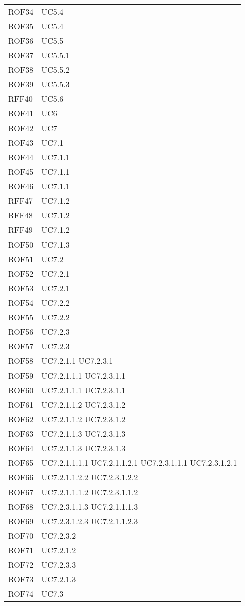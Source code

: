\documentclass[../AnalisiDeiRequisiti_v3.0.0.tex]{subfiles}
\begin{document}
\begin{longtable}{p{4cm}!{\VRule[1pt]}p{4cm}}
ROF34 & UC5.4 \\
ROF35 & UC5.4 \\
ROF36 & UC5.5 \\
ROF37 & UC5.5.1 \\
ROF38 & UC5.5.2 \\
ROF39 & UC5.5.3 \\
RFF40 & UC5.6 \\
ROF41 & UC6 \\
ROF42 & UC7 \\
ROF43 & UC7.1 \\
ROF44 & UC7.1.1 \\
ROF45 & UC7.1.1 \\
ROF46 & UC7.1.1 \\
RFF47 & UC7.1.2 \\
RFF48 & UC7.1.2 \\
RFF49 & UC7.1.2 \\
ROF50 & UC7.1.3 \\
ROF51 & UC7.2 \\
ROF52 & UC7.2.1 \\
ROF53 & UC7.2.1 \\
ROF54 & UC7.2.2 \\
ROF55 & UC7.2.2 \\
ROF56 & UC7.2.3 \\
ROF57 & UC7.2.3 \\
ROF58 & UC7.2.1.1 UC7.2.3.1 \\
ROF59 & UC7.2.1.1.1 UC7.2.3.1.1 \\
ROF60 & UC7.2.1.1.1 UC7.2.3.1.1 \\
ROF61 & UC7.2.1.1.2 UC7.2.3.1.2 \\
ROF62 & UC7.2.1.1.2 UC7.2.3.1.2 \\
ROF63 & UC7.2.1.1.3 UC7.2.3.1.3 \\
ROF64 & UC7.2.1.1.3 UC7.2.3.1.3 \\
ROF65 & UC7.2.1.1.1.1 UC7.2.1.1.2.1 UC7.2.3.1.1.1 UC7.2.3.1.2.1 \\
ROF66 & UC7.2.1.1.2.2 UC7.2.3.1.2.2 \\
ROF67 & UC7.2.1.1.1.2 UC7.2.3.1.1.2 \\
ROF68 & UC7.2.3.1.1.3 UC7.2.1.1.1.3 \\
ROF69 & UC7.2.3.1.2.3 UC7.2.1.1.2.3 \\
ROF70 & UC7.2.3.2 \\
ROF71 & UC7.2.1.2 \\
ROF72 & UC7.2.3.3 \\
ROF73 & UC7.2.1.3 \\
ROF74 & UC7.3 \\

\end{longtable}
\end{document}
